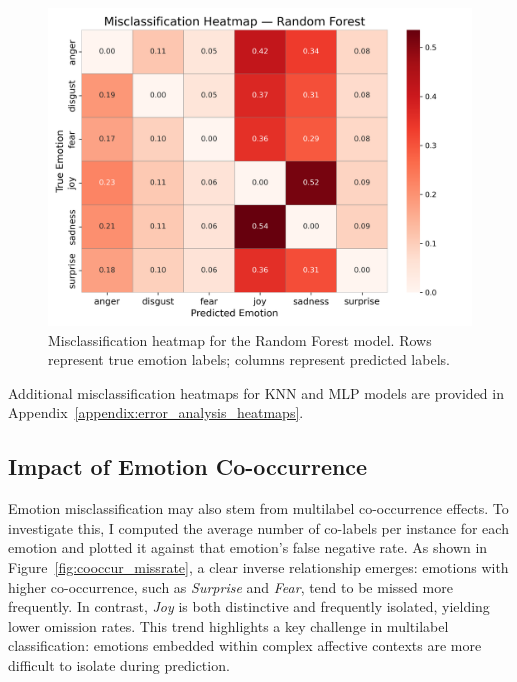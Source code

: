 \documentclass{article}
\begin{document}
\begin{figure}[H]
\centering
\includegraphics[width=\textwidth]{Graphics/misclassification_heatmap_random_forest.png}
\caption{Misclassification heatmap for the Random Forest model. Rows represent true emotion labels; columns represent predicted labels.}
\label{fig:confusion_rf}
\end{figure}

Additional misclassification heatmaps for KNN and MLP models are provided in Appendix~\ref{appendix:error_analysis_heatmaps}.

\subsection{Impact of Emotion Co-occurrence}

Emotion misclassification may also stem from multilabel co-occurrence effects. To investigate this, I computed the average number of co-labels per instance for each emotion and plotted it against that emotion’s false negative rate. As shown in Figure~\ref{fig:cooccur_missrate}, a clear inverse relationship emerges: emotions with higher co-occurrence, such as \textit{Surprise} and \textit{Fear}, tend to be missed more frequently. In contrast, \textit{Joy} is both distinctive and frequently isolated, yielding lower omission rates. This trend highlights a key challenge in multilabel classification: emotions embedded within complex affective contexts are more difficult to isolate during prediction.
\end{document}
